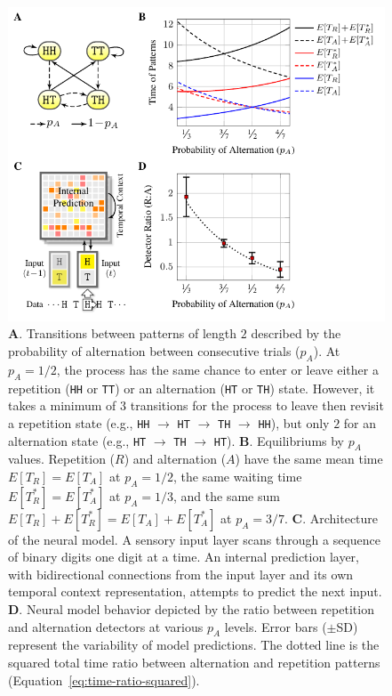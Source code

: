 \documentclass[11pt]{article}
\begin{document}
\begin{figure}[h!t]
  \centering\includegraphics[scale=1]{RND-Figs/Fig1}
  \caption{\textbf{A}. Transitions between patterns of length $2$ described by the probability of alternation between consecutive trials ($p_A$).
  At $p_A\!=\!1/2$, the process has the same chance to enter or leave either a repetition (\texttt{HH} or \texttt{TT}) or an alternation (\texttt{HT} or \texttt{TH}) state.
  However, it takes a minimum of $3$ transitions for the process to leave then revisit a repetition state (e.g., \texttt{HH} $\rightarrow$ \texttt{HT} $\rightarrow$ \texttt{TH} $\rightarrow$ \texttt{HH}), but only $2$ for an alternation state (e.g., \texttt{HT} $\rightarrow$ \texttt{TH} $\rightarrow$ \texttt{HT}).
  \textbf{B}. Equilibriums by $p_A$ values. Repetition ($R$) and alternation ($A$) have the same mean time $E[T_R] = E[T_A]$ at $p_A\!=\!1/2$, the same waiting time $E[T^*_R] = E[T^*_A]$ at $p_A\!=\!1/3$, and the same sum $E[T_R] + E[T^*_R] = E[T_A] + E[T^*_A]$ at $p_A\!=\!3/7$.
  \textbf{C}. Architecture of the neural model.
  A sensory input layer scans through a sequence of binary digits one digit at a time.
  An internal prediction layer, with bidirectional connections from the input layer and its own temporal context representation, attempts to predict the next input.
  \textbf{D}. Neural model behavior depicted by the ratio between repetition and alternation detectors at various $p_A$ levels. Error bars ($\pm$SD) represent the variability of model predictions. The dotted line is the squared total time ratio between alternation and repetition patterns (Equation~\ref{eq:time-ratio-squared}).
  }
  \label{fig1}
\end{figure}
\end{document}
